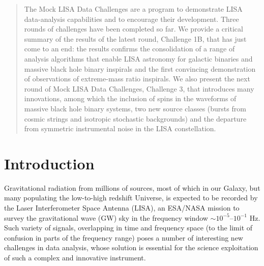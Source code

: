 \documentclass{iopart}
\begin{document}

\begin{abstract}
The Mock LISA Data Challenges are a program to demonstrate LISA data-analysis capabilities and to encourage their development. Three rounds of challenges have been completed so far. We provide a critical summary of the results of the latest round, Challenge 1B, that has just come to an end: the results confirms the consolidation of a range of analysis algorithms that enable LISA astronomy for galactic binaries and massive black hole binary inspirals and the first  convincing demonstration of observations of extreme-mass ratio inspirals. We also present the next round of Mock LISA Data Challenges, Challenge 3, that introduces many innovations, among which the inclusion of spins in the waveforms of massive black hole binary systems, two new source classes (bursts from cosmic strings and isotropic stochastic backgrounds) and the departure from symmetric instrumental noise in the LISA constellation. 
\end{abstract}

\vspace{-18pt}


\section{Introduction}

Gravitational radiation from millions of sources, most of which in our Galaxy, but many populating the low-to-high redshift Universe, is expected to be recorded by the Laser Interferometer Space Antenna (LISA), an ESA/NASA mission to survey the gravitational wave (GW) sky in the frequency window $\sim 10^{-5}$--$10^{-1}$ Hz\cite{lisa}. Such variety of signals, overlapping in time and frequency space (to the limit of confusion in parts of the frequency range) poses a number of interesting new challenges in data analysis, whose solution is essential for the science exploitation of such a complex and innovative instrument.
\end{document}
